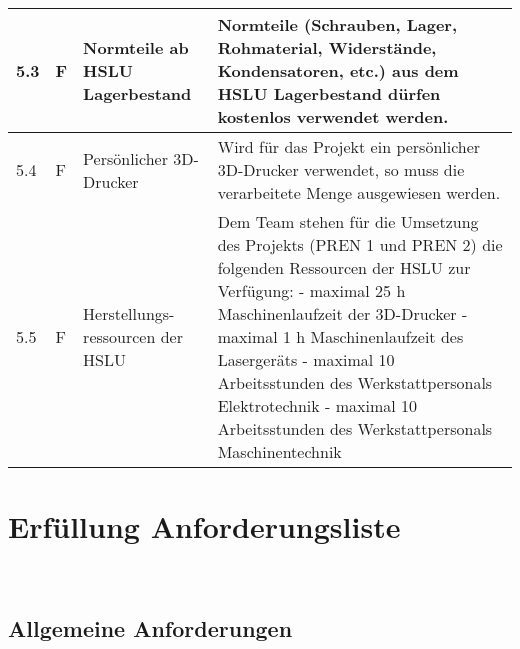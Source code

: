 \documentclass[main.tex]{subfiles} %
\begin{document}
\begin{tabular}{|l|p{0.5cm}|p{4cm}|p{10cm}|}
  \hline
  5.3          & F          & Normteile ab HSLU Lagerbestand   & Normteile (Schrauben, Lager, Rohmaterial, Widerstände, Kondensatoren, etc.) aus dem HSLU Lagerbestand dürfen kostenlos verwendet werden.                                                                                                                                                                                                                                                      \\
  \hline
  5.4          & F          & Persönlicher 3D-Drucker          & Wird für das Projekt ein persönlicher 3D-Drucker verwendet, so muss die verarbeitete Menge ausgewiesen werden.                                                                                                                                                                                                                                                                                \\
  \hline
  5.5          & F          & Herstellungs-ressourcen der HSLU & Dem Team stehen für die Umsetzung des Projekts (PREN 1 und PREN 2) die folgenden Ressourcen der HSLU zur Verfügung: \newline - maximal 25 h Maschinenlaufzeit der 3D-Drucker \newline - maximal 1 h Maschinenlaufzeit des Lasergeräts \newline - maximal 10 Arbeitsstunden des Werkstattpersonals Elektrotechnik \newline - maximal 10 Arbeitsstunden des Werkstattpersonals Maschinentechnik \\
  \hline
\end{tabular}

\newpage

\section{Erfüllung Anforderungsliste}~\label{appendix:Erfüllung_Anforderungsliste}

\subsection*{Allgemeine Anforderungen}
\end{document}
